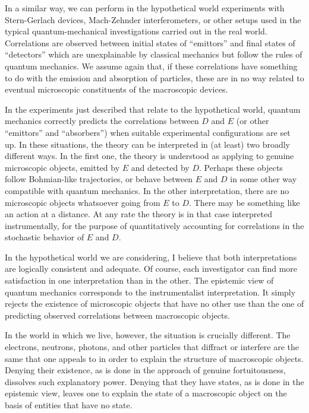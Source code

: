 \documentclass[12pt]{article}
\begin{document}
In a similar way, we can perform in the
hypothetical world experiments with Stern-Gerlach
devices, Mach-Zehnder interferometers, or other
setups used in the typical quantum-mechanical
investigations carried out in the real world.
Correlations are observed between initial states
of ``emittors'' and final states of ``detectors''
which are unexplainable by classical mechanics
but follow the rules of quantum mechanics.  We
assume again that, if these correlations have
something to do with the emission and absorption
of particles, these are in no way related
to eventual microscopic constituents of the
macroscopic devices.

In the experiments just described that relate to
the hypothetical world, quantum mechanics correctly
predicts the correlations between $D$ and $E$
(or other ``emittors'' and ``absorbers'') when suitable
experimental configurations are set up.  In these situations,
the theory can be interpreted in (at least) two
broadly different ways.  In the first one,
the theory is understood as applying to
genuine microscopic objects, emitted by $E$
and detected by $D$.  Perhaps these objects
follow Bohmian-like trajectories, or behave
between $E$ and $D$ in some other
way compatible with quantum mechanics.  In the
other interpretation, there are no microscopic
objects whatsoever going from $E$ to $D$.
There may be something like an action at a distance.
At any rate the theory is in that case
interpreted instrumentally,
for the purpose of quantitatively
accounting for correlations in the stochastic
behavior of $E$ and $D$.

In the hypothetical world we are considering,
I believe that both interpretations
are logically consistent and adequate.
Of course, each investigator can find more satisfaction
in one interpretation than in the other.  The
epistemic view of quantum mechanics corresponds to the
instrumentalist interpretation.  It
simply rejects the existence of
microscopic objects that have no other use
than the one of predicting observed
correlations between macroscopic objects.

In the world in which we live, however, the
situation is crucially different.  The electrons,
neutrons, photons, and other particles that diffract
or interfere are the same that one appeals to in
order to explain the structure of macroscopic objects.
Denying their existence, as is done in the approach
of genuine fortuitousness, dissolves such
explanatory power.  Denying that they
have states, as is done in the epistemic view, leaves
one to explain the state of a macroscopic object
on the basis of entities that have no state.
%
\end{document}
